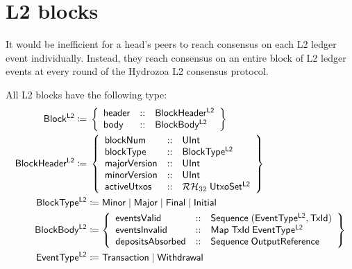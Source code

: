 \documentclass[../hydrozoa.tex]{subfiles}
\begin{document}
\chapter{L2 blocks}%
\label{h:l2-blocks}%

It would be inefficient for a head's peers to reach consensus on each L2 ledger event individually.
Instead, they reach consensus on an entire block of L2 ledger events at every round of the Hydrozoa L2 consensus protocol.

All L2 blocks have the following type:
\begin{equation*}
\begin{split}
  \mathsf{Block^{L2}} \coloneq&\; \left\{
    \begin{array}{lll}
      \mathsf{header} &::& \mathsf{BlockHeader^{L2}} \\
      \mathsf{body} &::& \mathsf{BlockBody^{L2}}
    \end{array}\right\} \\
  \mathsf{BlockHeader^{L2}} \coloneq&\; \left\{
    \begin{array}{lll}
      \mathsf{blockNum} &::& \mathsf{UInt} \\
      \mathsf{blockType} &::& \mathsf{BlockType^{L2}} \\
      \mathsf{majorVersion} &::& \mathsf{UInt} \\
      \mathsf{minorVersion} &::& \mathsf{UInt} \\
      \mathsf{activeUtxos} &::& \mathcal{RH}_{32} \; \mathsf{UtxoSet^{L2}}
    \end{array}\right\} \\
  \mathsf{BlockType^{L2}} &\coloneq
    \mathsf{Minor} \mid
    \mathsf{Major} \mid
    \mathsf{Final} \mid
    \mathsf{Initial} \\
  \mathsf{BlockBody^{L2}} &\coloneq \left\{
  \begin{array}{lll}
    \mathsf{eventsValid} &::&
      \mathsf{Sequence} \; (\mathsf{EventType^{L2}}, \mathsf{TxId}) \\
    \mathsf{eventsInvalid} &::&
      \mathsf{Map} \; \mathsf{TxId} \; \mathsf{EventType^{L2}} \\
    \mathsf{depositsAbsorbed} &::& \mathsf{Sequence} \; \mathsf{OutputReference}
  \end{array}\right\} \\
  \mathsf{EventType^{L2}} &\coloneq \mathsf{Transaction} \mid \mathsf{Withdrawal}
\end{split}
\end{equation*}
\end{document}
